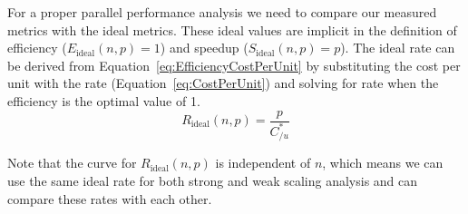 \documentclass{llncs}
\begin{document}
For a proper parallel performance analysis we need to compare our measured
metrics with the ideal metrics. These ideal values are implicit in the
definition of efficiency ($E_\mathrm{ideal}(n,p) = 1$) and speedup
($S_\mathrm{ideal}(n,p) = p$).
The ideal rate can be derived from Equation~\ref{eq:EfficiencyCostPerUnit}
by substituting the cost per unit with the rate
(Equation~\ref{eq:CostPerUnit}) and solving for rate when the efficiency is
the optimal value of 1.
\begin{equation}
  R_\mathrm{ideal}(n,p) = \frac{p}{C_{/u}^*}
  \label{eq:IdealRate}
\end{equation}

Note that the curve for $R_\mathrm{ideal}(n,p)$ is independent of $n$,
which means we can use the same ideal rate for both strong and weak scaling
analysis and can compare these rates with each other.


\end{document}
